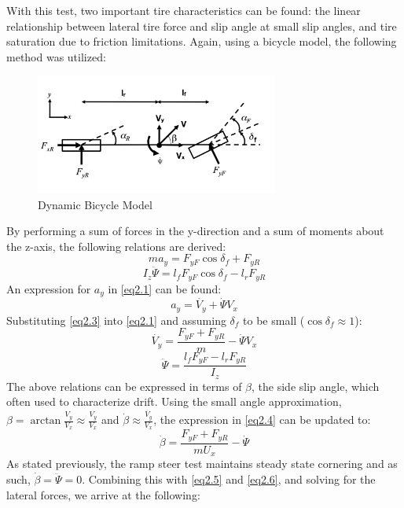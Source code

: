 \documentclass{article}
\numberwithin{equation}{section}
\begin{document}
With this test, two important tire characteristics can be found: the linear relationship between lateral tire force and slip angle at small slip angles, and tire saturation due to friction limitations. Again, using a bicycle model, the following method was utilized:
\begin{figure}[H]
\centering
\includegraphics[width=8cm]{BikeModelK.png}
\caption{Dynamic Bicycle Model}
\label{fig:BikeModelK}
\end{figure}
By performing a sum of forces in the y-direction and a sum of moments about the z-axis, the following relations are derived:
\begin{equation}\label{eq2.1}
    ma_y = F_{yF}\cos{\delta_f} + F_{yR}
\end{equation}
\begin{equation}\label{eq2.2}
    I_z\ddot{\Psi} = l_fF_{yF}\cos{\delta_f} - l_rF_{yR}
\end{equation}
An expression for $a_y$ in \eqref{eq2.1} can be found:
\begin{equation}\label{eq2.3}
    a_y = \dot{V_y} + \dot{\Psi} V_x
\end{equation}
Substituting \eqref{eq2.3} into \eqref{eq2.1} and assuming $\delta_f$ to be small ($\cos{\delta_f}\approx{1}$):
\begin{equation}\label{eq2.4}
    \dot{V_y} = \frac{F_{yF}+F_{yR}}{m} - \dot{\Psi} V_x
\end{equation}
\begin{equation}\label{eq2.5}
    \ddot{\Psi} = \frac{l_f F_{yF} - l_r F_{yR}}{I_z}
\end{equation}
The above relations can be expressed in terms of $\beta$, the side slip angle, which often used to characterize drift. Using the small angle approximation, $\beta = \arctan\frac{V_y}{V_x}\approx{\frac{V_y}{V_x}}$
and $\dot{\beta}\approx{\frac{\dot{V_y}}{V_x}}$, the expression in \eqref{eq2.4} can be updated to:
\begin{equation}\label{eq2.6}
    \dot{\beta} = \frac{F_{yF} + F_{yR}}{mU_x} - \dot{\Psi}
\end{equation}
As stated previously, the ramp steer test maintains steady state cornering and as such, $\dot{\beta} = \ddot{\Psi} = 0$. Combining this with \eqref{eq2.5} and \eqref{eq2.6}, and solving for the lateral forces, we arrive at the following:
\end{document}
